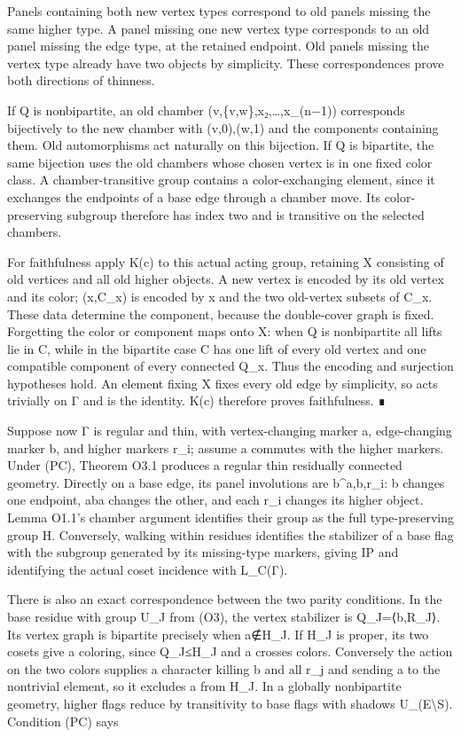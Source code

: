 \documentclass[
  10pt,
  letterpaper,
]{article}
\begin{document}
Panels containing both new vertex types correspond to old panels missing
the same higher type. A panel missing one new vertex type corresponds to
an old panel missing the edge type, at the retained endpoint. Old panels
missing the vertex type already have two objects by simplicity. These
correspondences prove both directions of thinness.

If Q is nonbipartite, an old chamber (v,\{v,w\},x₂,\ldots,x\_(n−1))
corresponds bijectively to the new chamber with (v,0),(w,1) and the
components containing them. Old automorphisms act naturally on this
bijection. If Q is bipartite, the same bijection uses the old chambers
whose chosen vertex is in one fixed color class. A chamber-transitive
group contains a color-exchanging element, since it exchanges the
endpoints of a base edge through a chamber move. Its color-preserving
subgroup therefore has index two and is transitive on the selected
chambers.

For faithfulness apply K(c) to this actual acting group, retaining X
consisting of old vertices and all old higher objects. A new vertex is
encoded by its old vertex and its color; (x,C\_x) is encoded by x and
the two old-vertex subsets of C\_x. These data determine the component,
because the double-cover graph is fixed. Forgetting the color or
component maps onto X: when Q is nonbipartite all lifts lie in C, while
in the bipartite case C has one lift of every old vertex and one
compatible component of every connected Q\_x. Thus the encoding and
surjection hypotheses hold. An element fixing X fixes every old edge by
simplicity, so acts trivially on Γ and is the identity. K(c) therefore
proves faithfulness. ∎

Suppose now Γ is regular and thin, with vertex-changing marker a,
edge-changing marker b, and higher markers r\_i; assume a commutes with
the higher markers. Under (PC), Theorem O3.1 produces a regular thin
residually connected geometry. Directly on a base edge, its panel
involutions are b\^{}a,b,r\_i: b changes one endpoint, aba changes the
other, and each r\_i changes its higher object. Lemma O1.1's chamber
argument identifies their group as the full type-preserving group H.
Conversely, walking within residues identifies the stabilizer of a base
flag with the subgroup generated by its missing-type markers, giving IP
and identifying the actual coset incidence with L\_C(Γ).

There is also an exact correspondence between the two parity conditions.
In the base residue with group U\_J from (O3), the vertex stabilizer is
Q\_J=⟨b,R\_J⟩. Its vertex graph is bipartite precisely when a∉H\_J. If
H\_J is proper, its two cosets give a coloring, since Q\_J≤H\_J and a
crosses colors. Conversely the action on the two colors supplies a
character killing b and all r\_j and sending a to the nontrivial
element, so it excludes a from H\_J. In a globally nonbipartite
geometry, higher flags reduce by transitivity to base flags with shadows
U\_(E\textbackslash S). Condition (PC) says
\end{document}
